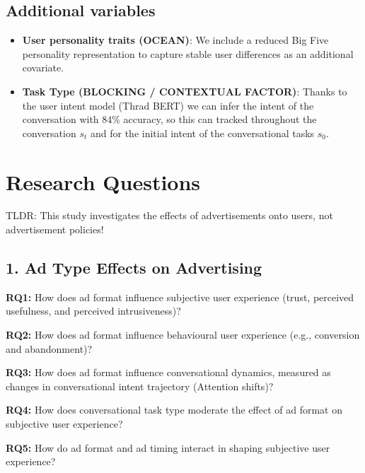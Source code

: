 \documentclass{article}
\begin{document}
\subsection{Additional variables}

\begin{itemize}
    \item \textbf{User personality traits (OCEAN)}:     We include a reduced Big Five personality representation to capture stable user differences as an additional covariate.
\end{itemize}

\begin{itemize}
    \item \textbf{Task Type (BLOCKING / CONTEXTUAL FACTOR)}: Thanks to the user intent model (Thrad BERT) we can infer the intent of the conversation with 84\% accuracy, so this can tracked throughout the conversation $s_t$ and for the initial intent of the conversational tasks $s_0$.

\end{itemize}
    
\newpage
\section{Research Questions}

TLDR: This study investigates the effects of advertisements onto users, not advertisement policies!

\subsection{1. Ad Type Effects on Advertising}

\textbf{RQ1:} How does ad format influence subjective user experience (trust, perceived usefulness, and perceived intrusiveness)?

\textbf{RQ2:} How does ad format influence behavioural user experience (e.g., conversion and abandonment)?

\textbf{RQ3:} How does ad format influence conversational dynamics, measured as changes in conversational intent trajectory (Attention shifts)?

\textbf{RQ4:} How does conversational task type moderate the effect of ad format on subjective user experience?

\textbf{RQ5:} How do ad format and ad timing interact in shaping subjective user experience?
\end{document}
